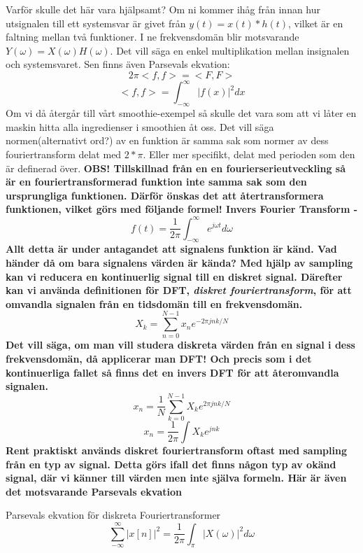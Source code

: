 \documentclass{article}
\begin{document}
Varför skulle det här vara hjälpsamt? Om ni kommer ihåg från innan hur utsignalen till ett systemsvar är givet från $y(t) = x(t) * h(t)$, vilket är en faltning mellan två funktioner. I ne frekvensdomän blir motsvarande $Y(\omega) = X(\omega) H(\omega)$. Det vill säga en enkel multiplikation mellan insignalen och systemsvaret. Sen finns även Parsevals ekvation:
$$ 2 \pi <f,f> = <F,F> $$ 
$$<f,f> = \int_{-\infty}^{\infty} |f(x)|^2 dx $$
Om vi då återgår till vårt smoothie-exempel så skulle det vara som att vi låter en maskin hitta alla ingredienser i smoothien åt oss.
Det vill säga normen(alternativt ord?) av en funktion är samma sak som normer av dess fouriertransform delat med $2*\pi$. Eller mer specifikt, delat med perioden som den är definerad över. %
\bf{OBS!} Tillskillnad från en en fourierserieutveckling så är en fouriertransformerad funktion \bf{inte} samma sak som den ursprungliga funktionen. Därför önskas det att återtransformera funktionen, vilket görs med följande formel! \newline
Invers Fourier Transform - 
$$f(t) = \frac{1}{2 \pi} \int_{-\infty}^{\infty}  e^{j \omega t} d\omega $$
Allt detta är under antagandet att signalens funktion är känd. Vad händer då om bara signalens värden är kända?
Med hjälp av sampling kan vi reducera en kontinuerlig signal till en diskret signal. Därefter kan vi använda definitionen för DFT, \emph{diskret fouriertransform}, för att omvandla signalen från en tidsdomän till en frekvensdomän.
$$X_k = \sum_{n=0}^{N-1} x_n e^{-2 \pi j n k/N}$$
Det vill säga, om man vill studera diskreta värden från en signal i dess frekvensdomän, då applicerar man DFT! Och precis som i det kontinuerliga fallet så finns det en invers DFT för att återomvandla signalen.
$$x_n = \frac{1}{N} \sum_{k=0}^{N-1} X_k e^{2 \pi j n k/N} $$
$$x_n = \frac{1}{2\pi} \int X_k e^{j n k}$$
Rent praktiskt används diskret fouriertransform oftast med sampling från en typ av signal. Detta görs ifall det finns någon typ av okänd signal, där vi känner till värden men inte själva formeln.
Här är även det motsvarande Parsevals ekvation

Parsevals ekvation för diskreta Fouriertransformer
$$\sum_{-\infty}^{\infty} |x[n]|^2 = \frac{1}{2\pi} \int_{\pi}|X(\omega)|^2 d\omega $$

\end{document}
